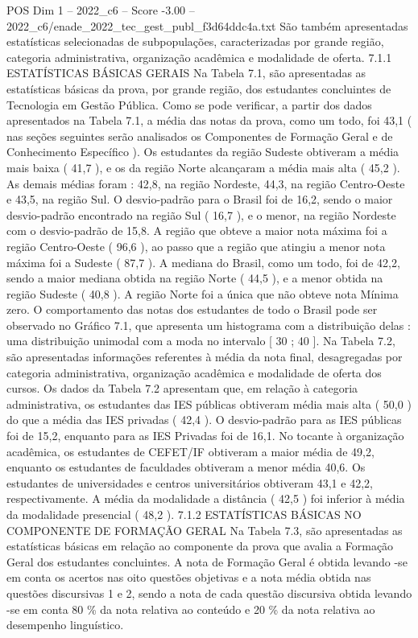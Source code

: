 \begin{textsample}{POS Dim 1 – 2022\_c6 – Score -3.00 – 2022\_c6/enade\_2022\_tec\_gest\_publ\_f3d64ddc4a.txt}
São também apresentadas estatísticas selecionadas de subpopulações, caracterizadas por grande região, categoria administrativa, organização acadêmica e modalidade de oferta. 7.1.1 ESTATÍSTICAS BÁSICAS GERAIS Na Tabela 7.1, são apresentadas as estatísticas básicas da prova, por grande região, dos estudantes concluintes de Tecnologia em Gestão Pública.
Como se pode verificar, a partir dos dados apresentados na Tabela 7.1, a média das notas da prova, como um todo, foi 43,1 ( nas seções seguintes serão analisados os Componentes de Formação Geral e de Conhecimento Específico ).
Os estudantes da região Sudeste obtiveram a média mais baixa ( 41,7 ), e os da região Norte alcançaram a média mais alta ( 45,2 ).
As demais médias foram : 42,8, na região Nordeste, 44,3, na região Centro-Oeste e 43,5, na região Sul.
O desvio-padrão para o Brasil foi de 16,2, sendo o maior desvio-padrão encontrado na região Sul ( 16,7 ), e o menor, na região Nordeste com o desvio-padrão de 15,8.
A região que obteve a maior nota máxima foi a região Centro-Oeste ( 96,6 ), ao passo que a região que atingiu a menor nota máxima foi a Sudeste ( 87,7 ).
A mediana do Brasil, como um todo, foi de 42,2, sendo a maior mediana obtida na região Norte ( 44,5 ), e a menor obtida na região Sudeste ( 40,8 ).
A região Norte foi a única que não obteve nota Mínima zero.
O comportamento das notas dos estudantes de todo o Brasil pode ser observado no Gráfico 7.1, que apresenta um histograma com a distribuição delas : uma distribuição unimodal com a moda no intervalo [ 30 ; 40 ].
Na Tabela 7.2, são apresentadas informações referentes à média da nota final, desagregadas por categoria administrativa, organização acadêmica e modalidade de oferta dos cursos.
Os dados da Tabela 7.2 apresentam que, em relação à categoria administrativa, os estudantes das IES públicas obtiveram média mais alta ( 50,0 ) do que a média das IES privadas ( 42,4 ).
O desvio-padrão para as IES públicas foi de 15,2, enquanto para as IES Privadas foi de 16,1.
No tocante à organização acadêmica, os estudantes de CEFET/IF obtiveram a maior média de 49,2, enquanto os estudantes de faculdades obtiveram a menor média 40,6.
Os estudantes de universidades e centros universitários obtiveram 43,1 e 42,2, respectivamente.
A média da modalidade a distância ( 42,5 ) foi inferior à média da modalidade presencial ( 48,2 ). 7.1.2 ESTATÍSTICAS BÁSICAS NO COMPONENTE DE FORMAÇÃO GERAL Na Tabela 7.3, são apresentadas as estatísticas básicas em relação ao componente da prova que avalia a Formação Geral dos estudantes concluintes.
A nota de Formação Geral é obtida levando -se em conta os acertos nas oito questões objetivas e a nota média obtida nas questões discursivas 1 e 2, sendo a nota de cada questão discursiva obtida levando -se em conta 80 \% da nota relativa ao conteúdo e 20 \% da nota relativa ao desempenho linguístico.

\end{textsample}
